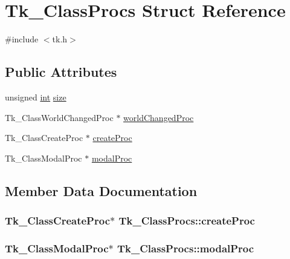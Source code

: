 \hypertarget{struct_tk___class_procs}{}\section{Tk\+\_\+\+Class\+Procs Struct Reference}
\label{struct_tk___class_procs}


{\ttfamily \#include $<$tk.\+h$>$}

\subsection*{Public Attributes}
\begin{DoxyCompactItemize}
\item 
unsigned \hyperlink{tk_8h_a83f82f76e7fed06f4c49d2db94028a6d}{int} \hyperlink{struct_tk___class_procs_ae3c696f19a9b4f801c0bea57e231be25}{size}
\item 
Tk\+\_\+\+Class\+World\+Changed\+Proc $\ast$ \hyperlink{struct_tk___class_procs_add8fc1b8ee534ecdb794e688d1b8fb89}{world\+Changed\+Proc}
\item 
Tk\+\_\+\+Class\+Create\+Proc $\ast$ \hyperlink{struct_tk___class_procs_aa9f9f5a77760ccbc86662bc3a59c6837}{create\+Proc}
\item 
Tk\+\_\+\+Class\+Modal\+Proc $\ast$ \hyperlink{struct_tk___class_procs_a8c86cd6fc798790df9566604a4d09db2}{modal\+Proc}
\end{DoxyCompactItemize}


\subsection{Member Data Documentation}
\subsubsection[{\texorpdfstring{create\+Proc}{createProc}}]{\setlength{\rightskip}{0pt plus 5cm}Tk\+\_\+\+Class\+Create\+Proc$\ast$ Tk\+\_\+\+Class\+Procs\+::create\+Proc}\hypertarget{struct_tk___class_procs_aa9f9f5a77760ccbc86662bc3a59c6837}{}\label{struct_tk___class_procs_aa9f9f5a77760ccbc86662bc3a59c6837}
\subsubsection[{\texorpdfstring{modal\+Proc}{modalProc}}]{\setlength{\rightskip}{0pt plus 5cm}Tk\+\_\+\+Class\+Modal\+Proc$\ast$ Tk\+\_\+\+Class\+Procs\+::modal\+Proc}\hypertarget{struct_tk___class_procs_a8c86cd6fc798790df9566604a4d09db2}{}\label{struct_tk___class_procs_a8c86cd6fc798790df9566604a4d09db2}
